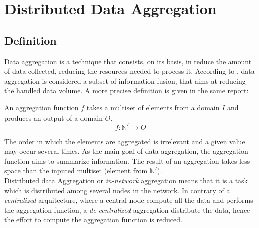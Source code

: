 \chapter{Distributed Data Aggregation}
\section{Definition}
Data aggregation is a technique that consists, on its basis, in reduce the amount of data collected, reducing the resources needed to process it.  According to \cite{journals/corr/abs-1110-0725}, data aggregation is  considered a subset of information fusion, that aims at reducing the handled data volume. A more precise definition is given in the same report:
\begin{definition} An aggregation function $f$ takes a multiset of elements from a domain $I$ and produces an output of a domain $O$.
\begin{equation*} f : \mathbb{N}^I \to O \end{equation*}
\end{definition}
The order in which the elements are aggregated is irrelevant and a given value may occur several times. As the main goal of data aggregation, the aggregation function aims to summarize information. The result of an aggregation takes less space than the inputed multiset (element from $\mathbb{N}^I$).\\
Distributed data Aggregation or \textit{in-network} aggregation means that it is a task which is distributed among several nodes in the network. In contrary of a \textit{centralized} arquitecture, where a central node compute all the data and performs the aggregation function, a \textit{de-centralized} aggregation distribute the data, hence the effort to compute the aggregation function is reduced.
